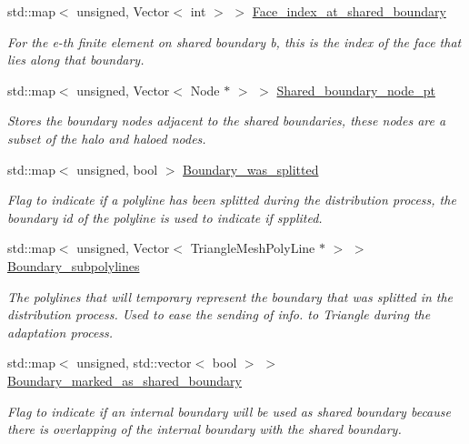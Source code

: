 \begin{DoxyCompactItemize}
std\+::map$<$ unsigned, Vector$<$ int $>$ $>$ \hyperlink{classoomph_1_1TriangleMesh_a47e462ebe20246557b6e68623942670b}{Face\+\_\+index\+\_\+at\+\_\+shared\+\_\+boundary}
\begin{DoxyCompactList}\small\item\em For the e-\/th finite element on shared boundary b, this is the index of the face that lies along that boundary. \end{DoxyCompactList}\item 
std\+::map$<$ unsigned, Vector$<$ Node $\ast$ $>$ $>$ \hyperlink{classoomph_1_1TriangleMesh_a73973f1a76bb9ff555e75b727c676d82}{Shared\+\_\+boundary\+\_\+node\+\_\+pt}
\begin{DoxyCompactList}\small\item\em Stores the boundary nodes adjacent to the shared boundaries, these nodes are a subset of the halo and haloed nodes. \end{DoxyCompactList}\item 
std\+::map$<$ unsigned, bool $>$ \hyperlink{classoomph_1_1TriangleMesh_a62fcac1292abe84ba6b739260cdbfef5}{Boundary\+\_\+was\+\_\+splitted}
\begin{DoxyCompactList}\small\item\em Flag to indicate if a polyline has been splitted during the distribution process, the boundary id of the polyline is used to indicate if spplited. \end{DoxyCompactList}\item 
std\+::map$<$ unsigned, Vector$<$ Triangle\+Mesh\+Poly\+Line $\ast$ $>$ $>$ \hyperlink{classoomph_1_1TriangleMesh_a4bc8a5ed3d771cec7c9f0de730b28a9f}{Boundary\+\_\+subpolylines}
\begin{DoxyCompactList}\small\item\em The polylines that will temporary represent the boundary that was splitted in the distribution process. Used to ease the sending of info. to Triangle during the adaptation process. \end{DoxyCompactList}\item 
std\+::map$<$ unsigned, std\+::vector$<$ bool $>$ $>$ \hyperlink{classoomph_1_1TriangleMesh_acd1571f3189dca349a49a8772cee21d6}{Boundary\+\_\+marked\+\_\+as\+\_\+shared\+\_\+boundary}
\begin{DoxyCompactList}\small\item\em Flag to indicate if an internal boundary will be used as shared boundary because there is overlapping of the internal boundary with the shared boundary. \end{DoxyCompactList}\item 

\end{DoxyCompactItemize}
